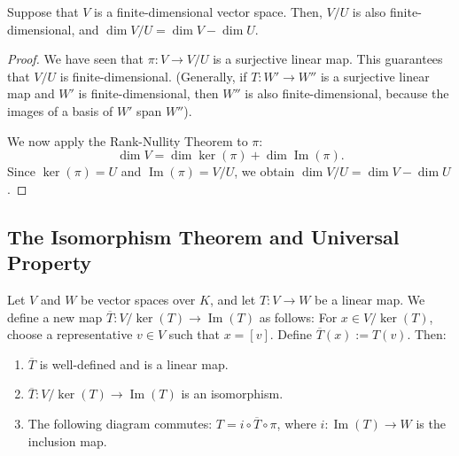 \begin{proposition} \label{prop:dim_quotient}
  Suppose that $V$ is a finite-dimensional vector space. Then, $V/U$ is also finite-dimensional, and $\dim V/U = \dim V - \dim U$.
\end{proposition}

\begin{proof}
  We have seen that $\pi \colon V \to V/U$ is a surjective linear map. This guarantees that $V/U$ is finite-dimensional. (Generally, if $T \colon W' \to W''$ is a surjective linear map and $W'$ is finite-dimensional, then $W''$ is also finite-dimensional, because the images of a basis of $W'$ span $W''$).

  We now apply the Rank-Nullity Theorem to $\pi$:
  \[ \dim V = \dim \ker(\pi) + \dim \operatorname{Im}(\pi). \]
  Since $\ker(\pi) = U$ and $\operatorname{Im}(\pi) = V/U$, we obtain $\dim V/U = \dim V - \dim U$.
\end{proof}

\subsection{The Isomorphism Theorem and Universal Property}

\begin{theorem}
  Let $V$ and $W$ be vector spaces over $K$, and let $T \colon V \to W$ be a linear map. We define a new map $\overline{T} \colon V/\ker(T) \to \operatorname{Im}(T)$ as follows: For $x \in V/\ker(T)$, choose a representative $v \in V$ such that $x = [v]$. Define $\overline{T}(x) := T(v)$. Then:
  \begin{enumerate}
    \item $\overline{T}$ is well-defined and is a linear map.
    \item $\overline{T} \colon V/\ker(T) \to \operatorname{Im}(T)$ is an isomorphism.
    \item {The following diagram commutes: $T = i \circ \overline{T} \circ \pi$, where $i \colon \operatorname{Im}(T) \to W$ is the inclusion map.
      \begin{center}
      \end{center}
    }

  \end{enumerate}
\end{theorem}

